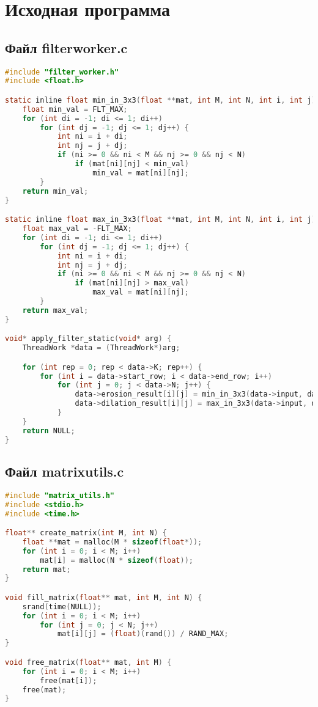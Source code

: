 \section{Исходная программа}


\subsection*{Файл filterworker.c}

\begin{lstlisting}[language=C,caption={Работа с потоками},captionpos=b]
#include "filter_worker.h"
#include <float.h>

static inline float min_in_3x3(float **mat, int M, int N, int i, int j) {
    float min_val = FLT_MAX;
    for (int di = -1; di <= 1; di++)
        for (int dj = -1; dj <= 1; dj++) {
            int ni = i + di;
            int nj = j + dj;
            if (ni >= 0 && ni < M && nj >= 0 && nj < N)
                if (mat[ni][nj] < min_val)
                    min_val = mat[ni][nj];
        }
    return min_val;
}

static inline float max_in_3x3(float **mat, int M, int N, int i, int j) {
    float max_val = -FLT_MAX;
    for (int di = -1; di <= 1; di++)
        for (int dj = -1; dj <= 1; dj++) {
            int ni = i + di;
            int nj = j + dj;
            if (ni >= 0 && ni < M && nj >= 0 && nj < N)
                if (mat[ni][nj] > max_val)
                    max_val = mat[ni][nj];
        }
    return max_val;
}

void* apply_filter_static(void* arg) {
    ThreadWork *data = (ThreadWork*)arg;

    for (int rep = 0; rep < data->K; rep++) {
        for (int i = data->start_row; i < data->end_row; i++)
            for (int j = 0; j < data->N; j++) {
                data->erosion_result[i][j] = min_in_3x3(data->input, data->M, data->N, i, j);
                data->dilation_result[i][j] = max_in_3x3(data->input, data->M, data->N, i, j);
            }
    }
    return NULL;
}

\end{lstlisting}

\subsection*{Файл matrixutils.c}

\begin{lstlisting}[language=C,caption={Работа с матрицами},captionpos=b]
#include "matrix_utils.h"
#include <stdio.h>
#include <time.h>

float** create_matrix(int M, int N) {
    float **mat = malloc(M * sizeof(float*));
    for (int i = 0; i < M; i++)
        mat[i] = malloc(N * sizeof(float));
    return mat;
}

void fill_matrix(float** mat, int M, int N) {
    srand(time(NULL));
    for (int i = 0; i < M; i++)
        for (int j = 0; j < N; j++)
            mat[i][j] = (float)(rand()) / RAND_MAX;
}

void free_matrix(float** mat, int M) {
    for (int i = 0; i < M; i++)
        free(mat[i]);
    free(mat);
}

\end{lstlisting}

